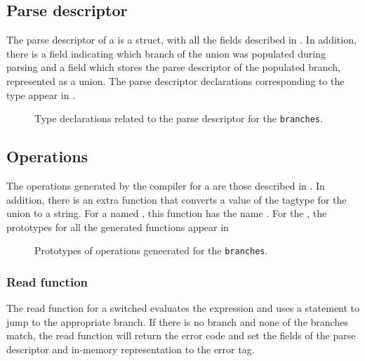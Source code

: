 \subsection{Parse descriptor}
\label{sec:unions-parse-descriptors}
The parse descriptor of a \Punion{} is a \C{} struct, with all
the fields described in . In
addition,  there is a  field indicating which branch of the
union was populated during parsing and a  field which stores
the parse descriptor of the populated branch, represented as a \C{}
union.  The parse descriptor declarations corresponding to the
\pads{} type 
appear in .

\begin{figure}

\caption{Type declarations related to the parse descriptor for
  the \Punion{} \texttt{branches}.}
\label{fig:punion-pd}
\end{figure}

\subsection{Operations}
The operations generated by the \pads{} compiler for a \Punion{} are
those described in .  In addition, there
is an extra function that converts a value of the tagtype for the
union to a string.  For a \Punion{} named , this function
has the name .  
For the \Punion{}
, the prototypes for all the generated functions appear in
\begin{figure}

\caption{Prototypes of operations geneerated for
  the \Punion{} \texttt{branches}.}
\label{fig:punion-ops}
\end{figure}



\subsubsection{Read function}
The read function for a switched \Punion{} evaluates the \Pswitch{}
expression and uses a \C{}  statement to jump to the
appropriate branch.  If there is no \Pdefault{} branch and none of the
\Pcase{} branches match,  the read function will return the error code
 and set the  fields of the parse
descriptor and in-memory representation to the error tag. 

